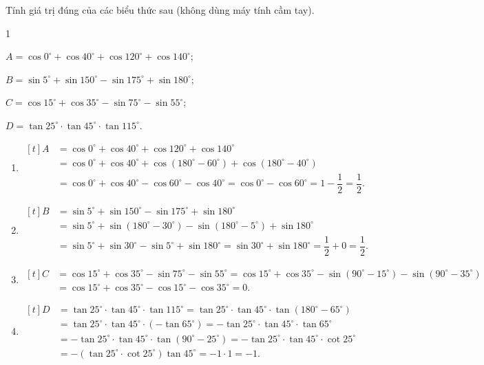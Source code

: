 \begin{vd}%
	Tính giá trị đúng của các biểu thức sau (không dùng máy tính cầm tay).
	\begin{enumEX}[a)]{1}
		\item $A=\cos 0^\circ + \cos 40^\circ + \cos 120^\circ + \cos 140^\circ$;
		\item $B=\sin 5^\circ + \sin 150^\circ - \sin 175^\circ + \sin 180^\circ$;
		\item $C=\cos 15^\circ + \cos 35^\circ - \sin 75^\circ - \sin 55^\circ$;
		\item $D=\tan 25^\circ\cdot \tan 45^\circ\cdot \tan 115^\circ$.
	\end{enumEX}
	\loigiai
	{
		\begin{enumerate}
			\item $\begin{aligned}[t]
				A &=\cos 0^\circ + \cos 40^\circ + \cos 120^\circ + \cos 140^\circ \\
				&= \cos 0^\circ + \cos 40^\circ + \cos\left(180^\circ - 60^\circ\right) + \cos\left(180^\circ - 40^\circ\right)\\
				&=\cos 0^\circ + \cos 40^\circ - \cos 60^\circ - \cos 40^\circ = \cos 0^\circ - \cos 60^\circ = 1-\dfrac{1}{2} = \dfrac{1}{2}.
			\end{aligned}$
			\item $\begin{aligned}[t]
				B &=\sin 5^\circ + \sin 150^\circ - \sin 175^\circ + \sin 180^\circ \\
				&= \sin 5^\circ + \sin\left(180^\circ-30^\circ\right) - \sin\left(180^\circ-5^\circ\right) + \sin 180^\circ\\
				&=\sin 5^\circ + \sin 30^\circ - \sin 5^\circ + \sin 180^\circ = \sin 30^\circ + \sin 180^\circ = \dfrac{1}{2}+0 = \dfrac{1}{2}.
			\end{aligned}$
			\item $\begin{aligned}[t]
				C &=\cos 15^\circ + \cos 35^\circ - \sin 75^\circ - \sin 55^\circ = \cos 15^\circ + \cos 35^\circ - \sin\left(90^\circ-15^\circ\right) - \sin\left(90^\circ-35^\circ\right)\\
				&=\cos 15^\circ + \cos 35^\circ - \cos 15^\circ - \cos 35^\circ = 0.
			\end{aligned}$
			\item $\begin{aligned}[t]
				D &=\tan 25^\circ\cdot \tan 45^\circ\cdot \tan 115^\circ = \tan 25^\circ\cdot \tan 45^\circ\cdot \tan\left(180^\circ - 65^\circ\right)\\
				&= \tan 25^\circ\cdot \tan 45^\circ\cdot \left(-\tan 65^\circ\right)=-\tan 25^\circ\cdot \tan 45^\circ\cdot  \tan 65^\circ \\
				&=-\tan 25^\circ\cdot \tan 45^\circ\cdot \tan\left(90^\circ - 25^\circ\right) = -\tan 25^\circ\cdot \tan 45^\circ\cdot \cot 25^\circ\\
				&=-\left(\tan 25^\circ \cdot \cot 25^\circ\right)\tan 45^\circ = -1\cdot 1 = -1.
			\end{aligned}$
		\end{enumerate}
	}
\end{vd}

